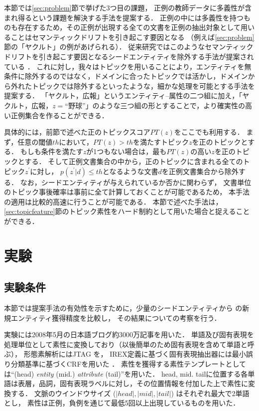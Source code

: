 \documentclass[japanese]{jnlp_1.4}
\begin{document}
本節では\ref{sec:problem}節で挙げた3つ目の課題，
正例の教師データに多義性が含まれ得るという課題を解決する手法を提案する．
正例の中には多義性を持つものも存在するため，その正例が出現する全ての文書を正例の抽出対象として用いることはセマンティックドリフトを引き起こす要因となる
（例えば\ref{sec:problem}節の「ヤクルト」の例があげられる）．
従来研究ではこのようなセマンティックドリフトを引き起こす要因となるシードエンティティを除外する手法が提案されている \cite{vyas2009helping}．
これに対し，我々はトピックを用いることにより，エンティティを無条件に除外するのではなく，ドメインに合ったトピックでは活かし，ドメインから外れたトピックでは除外するといったような，細かな処理を可能とする手法を提案する．
「ヤクルト，広報」というエンティティ--属性の二つ組に加え，「ヤクルト，広報，$z=\text{``野球''}$」のような三つ組の形とすることで，より確実性の高い正例集合を作ることができる．


具体的には，前節で述べた正のトピックスコア$PT(z)$をここでも利用する．
まず，任意の閾値$th$において，$PT(z)>th$を満たすトピック$z$を正のトピックとする．
もしも条件を満たす$z$が1つもない場合は，最も$PT(z)$の高い$z$を正のトピックとする．
そして正例文書集合の中から，正のトピックに含まれる全てのトピック$z^\prime$に対し， $p(z^\prime |d)\le th $となるような文書$d$を正例文書集合から除外する．
なお，シードエンティティが与えられているか否かに関わらず，
文書単位のトピック事後確率は事前に全て計算しておくことが可能であるため，
本手法の適用は比較的高速に行うことが可能である．
本節で述べた手法は，\ref{sec:topicfeature}節のトピック素性をハード制約として用いた場合と捉えることができる．






\section{実験}

\subsection{実験条件}

本節では提案手法の有効性を示すために，少量のシードエンティティから
の新規エンティティ獲得精度を比較し，
その結果についての考察を行う．


実験には2008年5月の日本語ブログ約3000万記事を用いた．
単語及び固有表現を処理単位として素性に変換しており（以後簡単のため固有表現を含めて単語と呼ぶ），
形態素解析にはJTAG \cite{Fuchi98} を，
IREX定義に基づく固有表現抽出器には最小誤り分類基準に基づくCRFを用いた \cite{suzuki2006training}．
素性を獲得する素性テンプレートとしては``(head) \textit{entity} (mid.) \textit{attribute} (tail)''を用いた．
head, mid. tailに位置する各単語は表層，品詞，固有表現ラベルに対し，その位置情報を付加した上で素性に変換する．
文脈のウインドウサイズ ($|head|,|mid|,|tail|$) はそれぞれ最大で2単語とし，
素性は正例，負例を通じて最低5回以上出現しているものを用いた．
\end{document}
